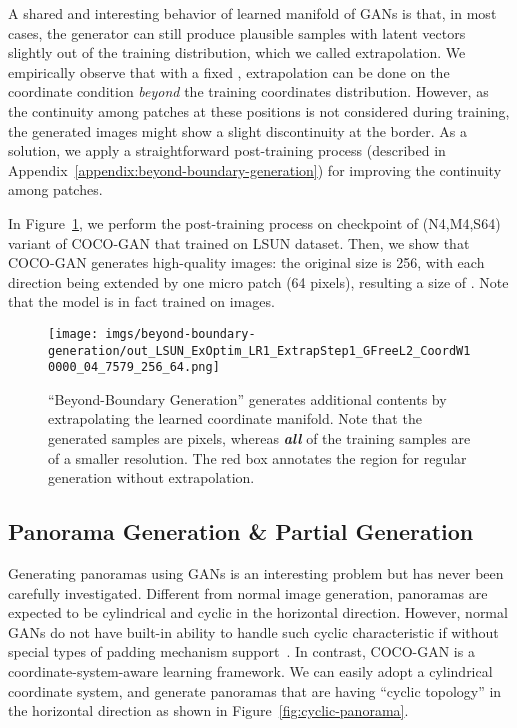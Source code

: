 \documentclass{article}
\newcommand{\modelName}{COCO-GAN }
\begin{document}
        A shared and interesting behavior of learned manifold of GANs is that, in most cases, the generator can still produce plausible samples with latent vectors slightly out of the training distribution, which we called extrapolation. 
We empirically observe that with a fixed , extrapolation can be done on the coordinate condition \textit{beyond} the training coordinates distribution. However, as the continuity among patches at these positions is not considered during training, the generated images might show a slight discontinuity at the border. As a solution, we apply a straightforward post-training process (described in Appendix~\ref{appendix:beyond-boundary-generation}) for improving the continuity among patches.
        
        In Figure~\ref{fig:beyond-boundary-generation}, we perform the post-training process on checkpoint of (N4,M4,S64) variant of \modelName that trained on LSUN dataset. Then, we show that \modelName generates high-quality  images: the original size is 256, with each direction being extended by one micro patch (64 pixels), resulting a size of . Note that the model is in fact trained on  images. 
        


        \begin{figure}[t]
            \texttt{[image: imgs/beyond-boundary-generation/out\_LSUN\_ExOptim\_LR1\_ExtrapStep1\_GFreeL2\_CoordW10000\_04\_7579\_256\_64.png]}
            \caption{``Beyond-Boundary Generation'' generates additional contents by extrapolating the learned coordinate manifold. Note that the generated samples are  pixels, whereas \textbf{\textit{all}} of the training samples are of a smaller  resolution. The {\color{red} red} box annotates the  region for regular generation without extrapolation.} 
            \label{fig:beyond-boundary-generation}
            \vspace{-1em}
        \end{figure}
        
    \subsection{Panorama Generation \& Partial Generation}
    
        \label{exp:panorama-generation}
        
        Generating panoramas using GANs is an interesting problem but has never been carefully investigated. Different from normal image generation, panoramas are expected to be cylindrical and cyclic in the horizontal direction. However, normal GANs do not have built-in ability to handle such cyclic characteristic if without special types of padding mechanism support~\cite{cube-padding}. In contrast, \modelName is a coordinate-system-aware learning framework. We can easily adopt a cylindrical coordinate system, and generate panoramas that are having ``cyclic topology'' in the horizontal direction as shown in Figure~\ref{fig:cyclic-panorama}. 
\end{document}
